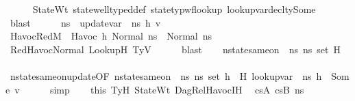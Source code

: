 \begin{isabellebody}
\ \ \ \ \isamarkupfalse%
\ StateWt\ state{\isacharunderscore}{\kern0pt}well{\isacharunderscore}{\kern0pt}typed{\isacharunderscore}{\kern0pt}def\ state{\isacharunderscore}{\kern0pt}typ{\isacharunderscore}{\kern0pt}wf{\isacharunderscore}{\kern0pt}lookup\ lookup{\isacharunderscore}{\kern0pt}var{\isacharunderscore}{\kern0pt}decl{\isacharunderscore}{\kern0pt}ty{\isacharunderscore}{\kern0pt}Some\ \isamarkupfalse%
\ blast\ \ \isanewline
\ \ \isamarkupfalse%
\ {\isacharquery}{\kern0pt}ns{}\ {\isacharequal}{\kern0pt}\ {\isachardoublequoteopen}update{\isacharunderscore}{\kern0pt}var\ {\isasymLambda}\ ns{}\ h\ v{\isachardoublequoteclose}\isanewline
\ \ \isamarkupfalse%
\ HavocRed{\isacharcolon}{\kern0pt}{\isachardoublequoteopen}M{\isacharcomma}{\kern0pt}{\isasymLambda}{\isacharcomma}{\kern0pt}{\isasymGamma}{\isacharcomma}{\kern0pt}{\isasymOmega}\ {\isasymturnstile}\ {\isasymlangle}Havoc\ h{\isacharcomma}{\kern0pt}\ Normal\ ns{}{\isasymrangle}\ {\isasymrightarrow}\ Normal\ {\isacharquery}{\kern0pt}ns{}{\isachardoublequoteclose}\isanewline
\ \ \ \ \isamarkupfalse%
\ RedHavocNormal\ LookupH\ TyV\isanewline
\ \ \ \ \isamarkupfalse%
\ blast\isanewline
\ \ \isamarkupfalse%
\ {\isachardoublequoteopen}nstate{\isacharunderscore}{\kern0pt}same{\isacharunderscore}{\kern0pt}on\ {\isasymLambda}\ ns{}\ {\isacharquery}{\kern0pt}ns{}\ {\isacharparenleft}{\kern0pt}set\ H{\isacharparenright}{\kern0pt}{\isachardoublequoteclose}\isanewline
\ \ \ \ \isamarkupfalse%
\ nstate{\isacharunderscore}{\kern0pt}same{\isacharunderscore}{\kern0pt}on{\isacharunderscore}{\kern0pt}update{\isacharbrackleft}{\kern0pt}OF\ {\isacartoucheopen}nstate{\isacharunderscore}{\kern0pt}same{\isacharunderscore}{\kern0pt}on\ {\isasymLambda}\ ns{}\ ns{}\ {\isacharparenleft}{\kern0pt}set\ {\isacharparenleft}{\kern0pt}h\ {\isacharhash}{\kern0pt}\ H{\isacharparenright}{\kern0pt}{\isacharparenright}{\kern0pt}{\isacartoucheclose}\ {\isacartoucheopen}lookup{\isacharunderscore}{\kern0pt}var\ {\isasymLambda}\ ns{}\ h\ {\isacharequal}{\kern0pt}\ Some\ v{\isacartoucheclose}{\isacharbrackright}{\kern0pt}\isanewline
\ \ \ \ \isamarkupfalse%
\ simp\isanewline
\ \ \isamarkupfalse%
\ this\ TyH\ StateWt\ DagRel{\isacharunderscore}{\kern0pt}Havoc{\isachardot}{\kern0pt}IH\ \isamarkupfalse%
\ cs{}A\ cs{}B\ ns{}{\isacharprime}{\kern0pt}\ \isanewline

\end{isabellebody}
